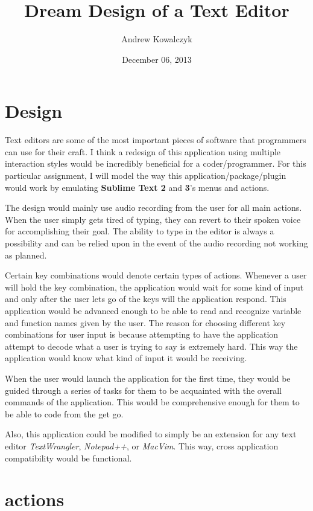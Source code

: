 \documentclass[11pt, oneside]{article}
\title{Dream Design of a Text Editor}
\author{Andrew Kowalczyk}
\date{December 06, 2013}
\begin{document}
\maketitle


\section{Design}

Text editors are some of the most important pieces of software that programmers can use for their craft. I think a redesign of this application using multiple interaction styles would be incredibly beneficial for a coder/programmer. For this particular assignment, I will model the way this application/package/plugin would work by emulating \textbf{Sublime Text 2} and \textbf{3}'s menus and actions.

The design would mainly use audio recording from the user for all main actions. When the user simply gets tired of typing, they can revert to their spoken voice for accomplishing their goal. The ability to type in the editor is always a possibility and can be relied upon in the event of the audio recording not working as planned.

Certain key combinations would denote certain types of actions. Whenever a user will hold the key combination, the application would wait for some kind of input and only after the user lets go of the keys will the application respond. This application would be advanced enough to be able to read and recognize variable and function names given by the user. The reason for choosing different key combinations for user input is because attempting to have the application attempt to decode what a user is trying to say is extremely hard. This way the application would know what kind of input it would be receiving.

When the user would launch the application for the first time, they would be guided through a series of tasks for them to be acquainted with the overall commands of the application. This would be comprehensive enough for them to be able to code from the get go.

Also, this application could be modified to simply be an extension for any text editor \textit{TextWrangler}, \textit{Notepad++}, or \textit{MacVim}. This way, cross application compatibility would be functional.

\section{ actions}
\end{document}
